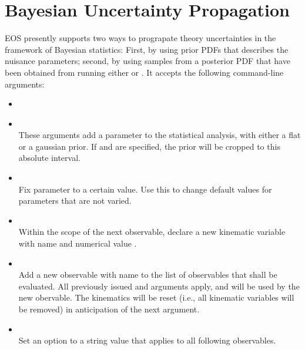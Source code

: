 \section{Bayesian Uncertainty Propagation}
\label{sec:usage:eos-propagate-uncertainty}

EOS presently supports two ways to prograpate theory uncertainties in the
framework of Bayesian statistics: First, by using prior PDFs that describes
the nuisance parameters; second, by using samples from a posterior PDF that
have been obtained from running either  or
. It accepts the following command-line arguments:
\begin{itemize}
    \item[] \\[-3\medskipamount]
    \item[] \\[\medskipamount]
        These arguments add a parameter to the statistical analysis, with
        either a flat or a gaussian prior. If  and
         are specified, the prior will be cropped to this
        absolute interval.

    \item[] \\[\medskipamount]
      Fix parameter to a certain value. Use this to change default values for
      parameters that are not varied.

    \item[] \\[\medskipamount]
        Within the scope of the next observable, declare a new kinematic
        variable with name  and numerical value .

    \item[] \\[\medskipamount]
        Add a new observable with name  to the list of observables
        that shall be evaluated. All previously issued 
        and  arguments apply, and will be used by the new obervable.
        The kinematics will be reset (i.e., all kinematic variables will be removed)
        in anticipation of the next  argument.

    \item[] \\[\medskipamount]
      Set an option to a string value that applies to all following observables.


\end{itemize}
